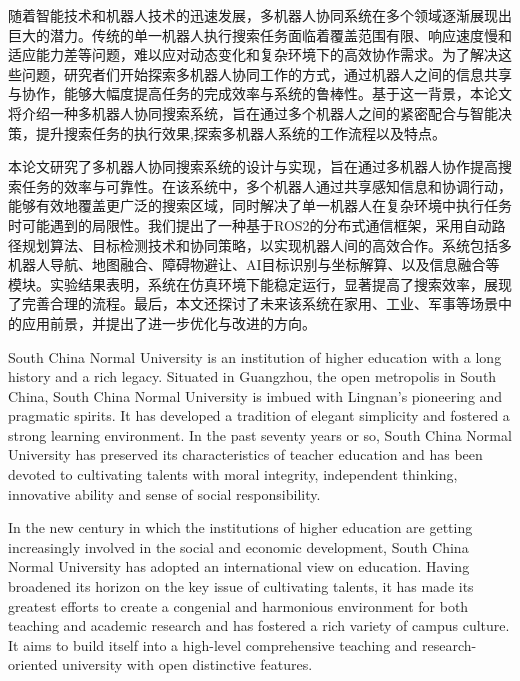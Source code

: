 
\begin{cabstract}
  随着智能技术和机器人技术的迅速发展，多机器人协同系统在多个领域逐渐展现出巨大的潜力。传统的单一机器人执行搜索任务面临着覆盖范围有限、响应速度慢和适应能力差等问题，难以应对动态变化和复杂环境下的高效协作需求。为了解决这些问题，研究者们开始探索多机器人协同工作的方式，通过机器人之间的信息共享与协作，能够大幅度提高任务的完成效率与系统的鲁棒性。基于这一背景，本论文将介绍一种多机器人协同搜索系统，旨在通过多个机器人之间的紧密配合与智能决策，提升搜索任务的执行效果,探索多机器人系统的工作流程以及特点。

  本论文研究了多机器人协同搜索系统的设计与实现，旨在通过多机器人协作提高搜索任务的效率与可靠性。在该系统中，多个机器人通过共享感知信息和协调行动，能够有效地覆盖更广泛的搜索区域，同时解决了单一机器人在复杂环境中执行任务时可能遇到的局限性。我们提出了一种基于ROS2的分布式通信框架，采用自动路径规划算法、目标检测技术和协同策略，以实现机器人间的高效合作。系统包括多机器人导航、地图融合、障碍物避让、AI目标识别与坐标解算、以及信息融合等模块。实验结果表明，系统在仿真环境下能稳定运行，显著提高了搜索效率，展现了完善合理的流程。最后，本文还探讨了未来该系统在家用、工业、军事等场景中的应用前景，并提出了进一步优化与改进的方向。
\end{cabstract}

\begin{eabstract}
  South China Normal University is an institution of higher education with a
  long history and a rich legacy. Situated in Guangzhou, the open metropolis in
  South China, South China Normal University is imbued with Lingnan's
  pioneering and pragmatic spirits. It has developed a tradition of elegant
  simplicity and fostered a strong learning environment. In the past seventy
  years or so, South China Normal University has preserved its characteristics
  of teacher education and has been devoted to cultivating talents with moral
  integrity, independent thinking, innovative ability and sense of social
  responsibility.

  In the new century in which the institutions of higher education are getting
  increasingly involved in the social and economic development, South China
  Normal University has adopted an international view on education. Having
  broadened its horizon on the key issue of cultivating talents, it has made its
  greatest efforts to create a congenial and harmonious environment for both
  teaching and academic research and has fostered a rich variety of campus
  culture. It aims to build itself into a high-level comprehensive teaching and
  research-oriented university with open distinctive features.
\end{eabstract}

